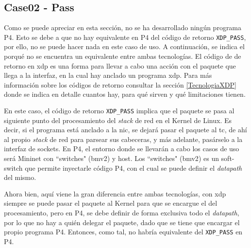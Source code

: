 \subsection{Case02 - Pass}
\label{P4_ether_case02}

Como se puede apreciar en esta sección, no se ha desarrollado ningún programa P4. Esto se debe a que no hay equivalente en P4 del código de retorno \texttt{XDP\_PASS}, por ello, no se puede hacer nada en este caso de uso. A continuación, se indica el porqué no se encuentra un equivalente entre ambas tecnologías. El código de de retorno en \gls{xdp} es una forma para llevar a cabo una acción con el paquete que llega a la interfaz, en la cual hay anclado un programa \gls{xdp}. Para más información sobre los códigos de retorno consultar la sección \ref{TecnologiaXDP} donde se indica en detalle cuantos hay, para qué sirven y qué limitaciones tienen.\\
\par

En este caso, el código de retorno \texttt{XDP\_PASS} implica que el paquete se pasa al siguiente punto del procesamiento del \textit{stack} de red en el Kernel de Linux. Es decir, si el programa está anclado a la \gls{nic}, se dejará pasar el paquete al \gls{tc}, de ahí al propio \textit{stack} de red para parsear sus cabeceras, y más adelante, pasárselo a la interfaz de sockets. En P4, el entorno donde se llevarán a cabo los casos de uso será Mininet con ``switches" (\gls{bmv2}) y host. Los ``switches" (\gls{bmv2}) es un soft-switch que permite inyectarle código P4, con el cual se puede definir el \textit{datapath} del mismo.\\
\par

Ahora bien, aquí viene la gran diferencia entre ambas tecnologías, con \gls{xdp} siempre se puede pasar el paquete al Kernel para que se encargue el del procesamiento, pero en P4, se debe definir de forma exclusiva todo el \textit{datapath}, por lo que no hay a quién delegar el paquete, dado que se tiene que encargar el propio programa P4. Entonces, como tal, no habría equivalente del \texttt{XDP\_PASS} en P4.